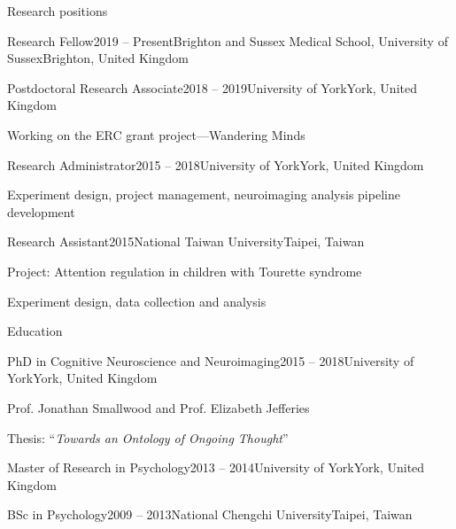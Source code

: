 \documentclass{resume} %
\begin{document}

\begin{rSection}{Research positions}

\begin{rSubsection}{Research Fellow}{2019 -- Present}{Brighton and Sussex Medical School, University of Sussex}{Brighton, United Kingdom}
\end{rSubsection}

\begin{rSubsection}{Postdoctoral Research Associate}{2018 -- 2019}{University of York}{York, United Kingdom}
\item Working on the ERC grant project---Wandering Minds
\end{rSubsection}

\begin{rSubsection}{Research Administrator}{2015 -- 2018}{University of York}{York, United Kingdom}
\item Experiment design, project management, neuroimaging analysis pipeline development
\end{rSubsection}

\begin{rSubsection}{Research Assistant}{2015}{National Taiwan University}{Taipei, Taiwan}
\item Project: Attention regulation in children with Tourette syndrome
\item Experiment design, data collection and analysis
\end{rSubsection}

\end{rSection}


\begin{rSection}{Education}

\begin{rSubsection}{PhD in Cognitive Neuroscience and Neuroimaging}{2015 -- 2018}{University of York}{York, United Kingdom}
\item Prof. Jonathan Smallwood and Prof. Elizabeth Jefferies
\item Thesis: ``\textit{Towards an Ontology of Ongoing Thought}''
\end{rSubsection}

\begin{rSubsection}{Master of Research in Psychology}{2013 -- 2014}{University of York}{York, United Kingdom}
\end{rSubsection}

\begin{rSubsection}{BSc in Psychology}{2009 -- 2013}{National Chengchi University}{Taipei, Taiwan}
\end{rSubsection}

\end{rSection}
\end{document}

